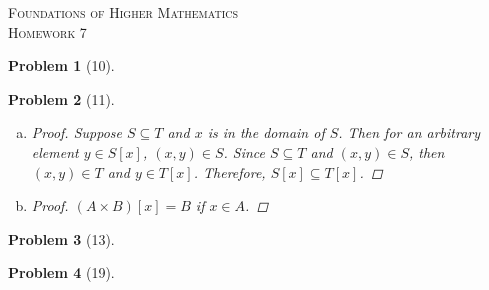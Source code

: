 \documentclass{article}
\theoremstyle{problem}
\newtheorem{prob}{Problem}
\theoremstyle{plain}
\theoremstyle{remark}
\begin{document}
\begin{center}
\textsc{\Large Foundations of Higher Mathematics}\\[.3cm]
\textsc{\Large Homework 7}
\end{center}

\begin{prob}[10]

\end{prob}
%

\begin{prob}[11]
\begin{enumerate}[a)]
\item \begin{proof}
Suppose $S \subseteq T$ and $x$ is in the domain of $S$. Then for an arbitrary element $y \in S[x]$, $(x,y) \in S$. Since $S \subseteq T$ and $(x,y) \in S$, then $(x,y) \in T$ and $y \in T[x]$. Therefore, $S[x] \subseteq T[x]$.
\end{proof}
\item \begin{proof}
$(A \times B)[x] = B$ if $x \in A$.
\end{proof}
\end{enumerate}
\end{prob}
%

\begin{prob}[13]

\end{prob}
%

\begin{prob}[19]

\end{prob}
%
\end{document}
